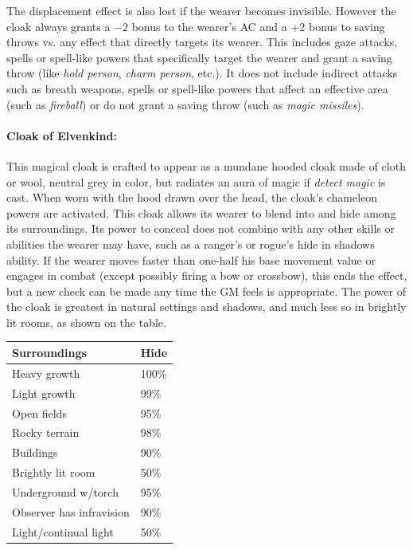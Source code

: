 \begin{multicols}{2}
The displacement effect is also lost if the wearer becomes invisible.  However the cloak always grants a $-2$ bonus to the wearer's AC and a +2 bonus to saving throws vs. any effect that directly targets its wearer.  This includes gaze attacks, spells or spell-like powers that specifically target the wearer and grant a saving throw (like \textit{hold person}, \textit{charm person}, etc.).  It does not include indirect attacks such as breath weapons, spells or spell-like powers that affect an effective area (such as \textit{fireball}) or do not grant a saving throw (such as \textit{magic missiles}).

\paragraph{Cloak of Elvenkind:} This magical cloak is crafted to appear as a mundane hooded cloak made of cloth or wool, neutral grey in color, but radiates an aura of magic if \textit{detect magic} is cast.  When worn with the hood drawn over the head, the cloak's chameleon powers are activated.  This cloak allows its wearer to blend into and hide among its surroundings.  Its power to conceal does not combine with any other skills or abilities the wearer may have, such as a ranger's or rogue's hide in shadows ability.  If the wearer moves faster than one-half his base movement value or engages in combat (except possibly firing a bow or crossbow), this ends the effect, but a new check can be made any time the GM feels is appropriate.  The power of the cloak is greatest in natural settings and shadows, and much less so in brightly lit rooms, as shown on the table.

\noindent
\begin{tabular}{|p{}|p{}|}
\hline
Surroundings	& Hide \\
\hline\hline
\rowcolor[gray]{.9}Heavy growth	& 100\% \\
Light growth	& 99\% \\
\rowcolor[gray]{.9}Open fields	& 95\% \\
Rocky terrain	& 98\% \\
\rowcolor[gray]{.9}Buildings	& 90\% \\
Brightly lit room	& 50\% \\
\rowcolor[gray]{.9}Underground w/torch	& 95\% \\
Observer has infravision	& 90\% \\
\rowcolor[gray]{.9}Light/continual light	& 50\% \\
\hline
\end{tabular}


\end{multicols}
